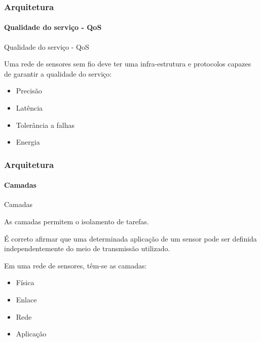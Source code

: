 \documentclass[notes]{beamer}
\begin{document}
\begin{frame}
\label{slide_40}
\frametitle{Arquitetura}
\framesubtitle{Qualidade do serviço - QoS}

\begin{block}{Qualidade do serviço - QoS}

Uma rede de sensores sem fio deve ter uma infra-estrutura e protocolos capazes de garantir a qualidade do serviço: \pause

\begin{itemize}

\item Precisão \pause
\item Latência \pause
\item Tolerância a falhas \pause
\item Energia 

\end{itemize}

\end{block}

\end{frame}

\begin{frame}
\label{slide_41}
\frametitle{Arquitetura}
\framesubtitle{Camadas}

\begin{block}{Camadas}

As camadas permitem o isolamento de tarefas.

\end{block} \pause

\begin{block}

É correto afirmar que uma determinada aplicação de um sensor pode ser definida independentemente do meio de transmissão utilizado.

\end{block} \pause

\begin{block}

Em uma rede de sensores, têm-se as camadas: \pause

\begin{itemize}

\item Física \pause
\item Enlace \pause
\item Rede \pause
\item Aplicação

\end{itemize}

\end{block}

\end{frame}
\end{document}
